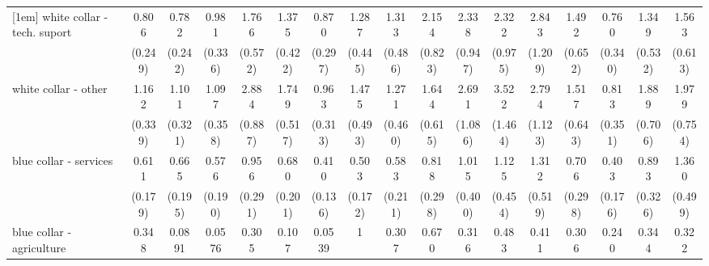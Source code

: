 {\begin{tabular}{l*{16}{c}}
[1em]
white collar - tech. suport&       0.806         &       0.782         &       0.981         &       1.766         &       1.375         &       0.870         &       1.287         &       1.313         &       2.154\sym{*}  &       2.338\sym{*}  &       2.322\sym{*}  &       2.843\sym{*}  &       1.492         &       0.760         &       1.349         &       1.563         \\
                    &     (0.249)         &     (0.242)         &     (0.336)         &     (0.572)         &     (0.422)         &     (0.297)         &     (0.445)         &     (0.486)         &     (0.823)         &     (0.947)         &     (0.975)         &     (1.209)         &     (0.652)         &     (0.340)         &     (0.532)         &     (0.613)         \\
[1em]
white collar - other&       1.162         &       1.101         &       1.097         &       2.884\sym{***}&       1.749         &       0.963         &       1.475         &       1.271         &       1.644         &       2.691\sym{*}  &       3.522\sym{**} &       2.794\sym{*}  &       1.517         &       0.813         &       1.889         &       1.979         \\
                    &     (0.339)         &     (0.321)         &     (0.358)         &     (0.887)         &     (0.517)         &     (0.313)         &     (0.493)         &     (0.460)         &     (0.615)         &     (1.086)         &     (1.464)         &     (1.123)         &     (0.643)         &     (0.351)         &     (0.706)         &     (0.754)         \\
[1em]
blue collar - services&       0.611         &       0.665         &       0.576         &       0.956         &       0.680         &       0.410\sym{**} &       0.503\sym{*}  &       0.583         &       0.818         &       1.015         &       1.125         &       1.312         &       0.706         &       0.403\sym{*}  &       0.893         &       1.360         \\
                    &     (0.179)         &     (0.195)         &     (0.190)         &     (0.291)         &     (0.201)         &     (0.136)         &     (0.172)         &     (0.211)         &     (0.298)         &     (0.400)         &     (0.454)         &     (0.519)         &     (0.298)         &     (0.176)         &     (0.326)         &     (0.499)         \\
[1em]
blue collar - agriculture&       0.348         &      0.0891\sym{**} &      0.0576\sym{*}  &       0.305         &       0.107\sym{*}  &      0.0539\sym{*}  &           1         &       0.307         &       0.670         &       0.316         &       0.483         &       0.411         &       0.306         &       0.240         &       0.344         &       0.322         \\

\end{tabular}}

